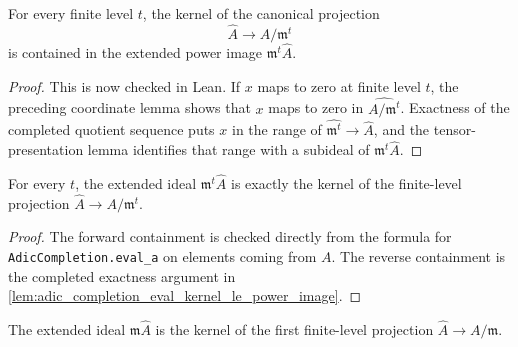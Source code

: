 \begin{lemma}
  \label{lem:adic_completion_eval_kernel_le_power_image}
  For every finite level \(t\), the kernel of the canonical projection
  \[
    \widehat A\to A/\mathfrak m^t
  \]
  is contained in the extended power image
  \(\mathfrak m^t\widehat A\).
\end{lemma}

\begin{proof}
  This is now checked in Lean.  If \(x\) maps to zero at finite level \(t\),
  the preceding coordinate lemma shows that \(x\) maps to zero in
  \(\widehat{A/\mathfrak m^t}\).  Exactness of the completed quotient sequence
  puts \(x\) in the range of
  \(\widehat{\mathfrak m^t}\to\widehat A\), and the tensor-presentation lemma
  identifies that range with a subideal of \(\mathfrak m^t\widehat A\).
\end{proof}

\begin{lemma}
  \label{lem:adic_completion_power_image_eq_eval_kernel}
  For every \(t\), the extended ideal
  \(\mathfrak m^t\widehat A\) is exactly the kernel of the finite-level
  projection \(\widehat A\to A/\mathfrak m^t\).
\end{lemma}

\begin{proof}
  The forward containment is checked directly from the formula for
  \texttt{AdicCompletion.eval\_a} on elements coming from \(A\).  The reverse
  containment is the completed exactness argument in
  \cref{lem:adic_completion_eval_kernel_le_power_image}.
\end{proof}

\begin{lemma}
  \label{lem:adic_completion_power_image_one_eq_eval_kernel}
  The extended ideal \(\mathfrak m\widehat A\) is the kernel of the first
  finite-level projection \(\widehat A\to A/\mathfrak m\).
\end{lemma}

